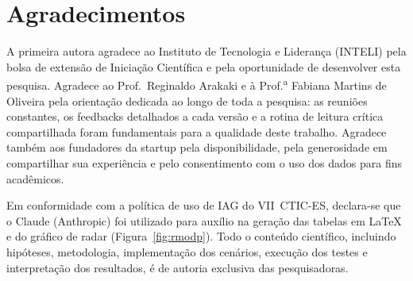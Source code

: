 \documentclass[sigconf]{acmart}
\begin{document}
\section*{Agradecimentos}

A primeira autora agradece ao Instituto de Tecnologia e Liderança (INTELI) pela
bolsa de extensão de Iniciação Científica e pela oportunidade de desenvolver esta
pesquisa. Agradece ao Prof.\ Reginaldo Arakaki e à Prof.\textsuperscript{a} Fabiana
Martins de Oliveira pela orientação dedicada ao longo de toda a pesquisa: as reuniões
constantes, os feedbacks detalhados a cada versão e a rotina de leitura crítica
compartilhada foram fundamentais para a qualidade deste trabalho. Agradece também
aos fundadores da startup pela disponibilidade, pela generosidade em compartilhar
sua experiência e pelo consentimento com o uso dos dados para fins acadêmicos.

Em conformidade com a política de uso de IAG do VII~CTIC-ES, declara-se
que o Claude (Anthropic) foi utilizado para auxílio na geração das tabelas em
\LaTeX{} e do gráfico de radar (Figura~\ref{fig:rmodp}). Todo o conteúdo científico,
incluindo hipóteses, metodologia, implementação dos cenários, execução dos testes e
interpretação dos resultados, é de autoria exclusiva das pesquisadoras.



\end{document}
